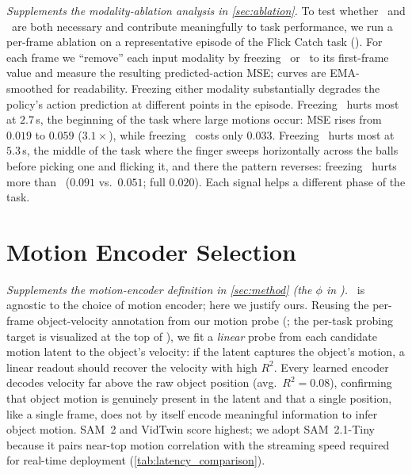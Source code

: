 \emph{Supplements the modality-ablation analysis in \cref{sec:ablation}.}
To test whether \TEMPOMOT\ and \TEMPOACT\ are both necessary and contribute meaningfully to task performance, we run a per-frame ablation on a representative episode of the Flick Catch task (). For each frame we ``remove'' each input modality by freezing \TEMPOMOT\ or \TEMPOACT\ to its first-frame value and measure the resulting predicted-action MSE; curves are EMA-smoothed for readability. Freezing either modality substantially degrades the policy's action prediction at different points in the episode. Freezing \TEMPOMOT\ hurts most at $2.7$\,s, the beginning of the task where large motions occur: MSE rises from $0.019$ to $0.059$ ($3.1\times$), while freezing \TEMPOACT\ costs only $0.033$. Freezing \TEMPOACT\ hurts most at $5.3$\,s, the middle of the task where the finger sweeps horizontally across the balls before picking one and flicking it, and there the pattern reverses: freezing \TEMPOACT\ hurts more than \TEMPOMOT\ ($0.091$ vs.\ $0.051$; full $0.020$). Each signal helps a different phase of the task.

\section{Motion Encoder Selection}
\label{app:motion_encoder}



\emph{Supplements the motion-encoder definition in \cref{sec:method} (the $\phi$ in \TEMPOMOT).}
\ours\ is agnostic to the choice of motion encoder; here we justify ours. Reusing the per-frame object-velocity annotation from our motion probe (; the per-task probing target is visualized at the top of ), we fit a \emph{linear} probe from each candidate motion latent to the object's velocity: if the latent captures the object's motion, a linear readout should recover the velocity with high $R^2$. Every learned encoder decodes velocity far above the raw object position (avg.\ $R^2 = 0.08$), confirming that object motion is genuinely present in the latent and that a single position, like a single frame, does not by itself encode meaningful information to infer object motion. SAM~2 and VidTwin score highest; we adopt SAM~2.1-Tiny because it pairs near-top motion correlation with the streaming speed required for real-time deployment (\cref{tab:latency_comparison}).
